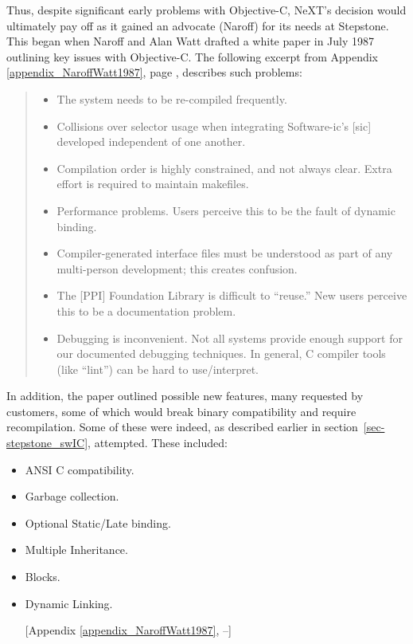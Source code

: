 \documentclass[acmsmall]{acmart}\settopmatter{}
\begin{document}
Thus, despite significant early problems with Objective-C, NeXT's decision would ultimately pay off as it gained an advocate (Naroff) for its needs at Stepstone. This began when Naroff and Alan Watt drafted a white paper in July 1987 outlining key issues with Objective-C. The following excerpt %
from Appendix \ref{appendix_NaroffWatt1987}, page , describes such problems:
\begin{quotation}
\begin{itemize}
\item The system needs to be re-compiled frequently.
\item Collisions over selector usage when integrating Software-ic's [sic] developed independent of one another.
\item Compilation order is highly constrained, and not always clear. Extra effort is required to maintain makefiles.
\item Performance problems. Users perceive this to be the fault of dynamic binding.
\item Compiler-generated interface files must be understood as part of any multi-person development; this creates confusion.
\item The [PPI] Foundation Library is difficult to ``reuse.'' New users perceive this to be a documentation problem.
\item Debugging is inconvenient. Not all systems provide enough support for our documented debugging techniques. In general, C compiler tools (like ``lint'') can be hard to use/interpret.
\end{itemize}
\end{quotation}
In addition, the paper outlined possible new features, many requested by customers, some of which would break binary compatibility and require recompilation. Some of these were indeed, as described earlier in section~\ref{sec-stepstone_swIC}, attempted. These included:
\begin{itemize}
\item ANSI C compatibility.
\item Garbage collection.
\item Optional Static/Late binding.
\item Multiple Inheritance.
\item Blocks.
\item Dynamic Linking. 
\addtocounter{appendixpagenumrangestart}{3}
\addtocounter{appendixpagenumrangeend}{7}
[Appendix  \ref{appendix_NaroffWatt1987},  --]
\end{itemize}
\end{document}
